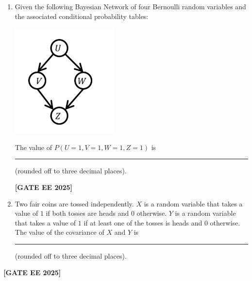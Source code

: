 \documentclass[journal]{IEEEtran}
\newcommand{\qfooter}{%
  \begin{flushright}\footnotesize\textbf{[GATE EE 2025]}\end{flushright}\vspace{1em}%
}
\begin{document}
\begin{enumerate}[leftmargin=*,label=\arabic*.]
\item Given the following Bayesian Network of four Bernoulli random variables and the associated conditional probability tables:

\begin{center}
\includegraphics[width=0.75\columnwidth]{figs/64.png} %
\end{center}

The value of $P(U=1, V=1, W=1, Z=1)$ is \rule{1cm}{0.075mm} (rounded off to three decimal places).
\qfooter


\item Two fair coins are tossed independently. $X$ is a random variable that takes a value of $1$ if both tosses are heads and $0$ otherwise. $Y$ is a random variable that takes a value of $1$ if at least one of the tosses is heads and $0$ otherwise. The value of the covariance of $X$ and $Y$ is \rule{7em}{0.07em} (rounded off to three decimal places).

\end{enumerate} 
\qfooter
\end{document}
